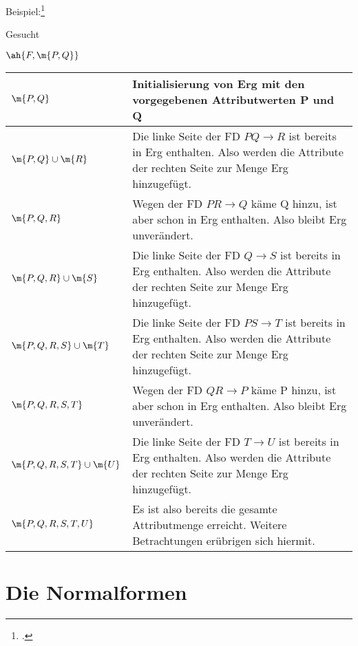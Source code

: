 \documentclass{bschlangaul-haupt}
\begin{document}
Beispiel:\footcite[Seite 8]{db:fs:4}


Gesucht

$\ah{F, \m{P,Q}}$

\noindent
\begin{tabularx}{\linewidth}{lX}
$\m{P, Q}$ &
Initialisierung von Erg mit den vorgegebenen Attributwerten P und Q
\\\hline

$\m{P, Q} \cup \m{R}$  &
Die linke Seite der FD $P Q \rightarrow R$ ist bereits in Erg enthalten.
Also werden die Attribute der rechten Seite zur Menge Erg hinzugefügt.
\\\hline

$\m{P, Q, R}$ &
Wegen der FD $PR \rightarrow Q$ käme Q hinzu, ist aber schon in Erg
enthalten. Also bleibt Erg unverändert.
\\\hline

$\m{P, Q, R} \cup \m{S}$ &
Die linke Seite der FD $Q \rightarrow S$ ist bereits in Erg enthalten.
Also werden die Attribute der rechten Seite zur Menge Erg hinzugefügt.
\\\hline

$\m{P, Q, R, S} \cup \m{T}$ &
Die linke Seite der FD $PS \rightarrow T$ ist bereits in Erg enthalten.
Also werden die Attribute der rechten Seite zur Menge Erg hinzugefügt.
\\\hline

$\m{P, Q, R, S, T}$ &
Wegen der FD $QR \rightarrow P$ käme P hinzu, ist aber schon in Erg
enthalten. Also bleibt Erg unverändert.
\\\hline

$\m{P, Q, R, S, T} \cup \m{U}$ &
Die linke Seite der FD $T \rightarrow U$ ist bereits in Erg enthalten.
Also werden die Attribute der rechten Seite zur Menge Erg hinzugefügt.
\\\hline

$\m{P, Q, R, S, T, U}$ &
Es ist also bereits die gesamte Attributmenge erreicht. Weitere
Betrachtungen erübrigen sich hiermit.
\\\hline
\end{tabularx}

\section{Die Normalformen}

%
\end{document}
